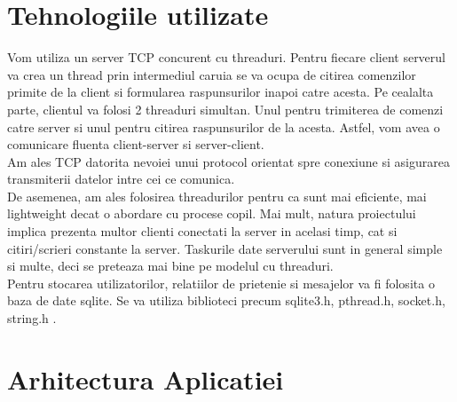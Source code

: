 \documentclass[runningheads]{llncs}
\begin{document}
\section{Tehnologiile utilizate}
Vom utiliza un server TCP concurent cu threaduri. Pentru fiecare client serverul va crea un thread prin intermediul caruia se va ocupa de citirea comenzilor primite de la client si formularea raspunsurilor inapoi catre acesta. Pe cealalta parte, clientul va folosi 2 threaduri simultan. Unul pentru trimiterea de comenzi catre server si unul pentru citirea raspunsurilor de la acesta. Astfel, vom avea o comunicare fluenta client-server si server-client.\\
Am ales TCP datorita nevoiei unui protocol orientat spre conexiune si asigurarea transmiterii datelor intre cei ce comunica.\\
De asemenea, am ales folosirea threadurilor pentru ca sunt mai eficiente, mai lightweight decat o abordare cu procese copil. Mai mult, natura proiectului implica prezenta multor clienti conectati la server in acelasi timp, cat si citiri/scrieri  constante la server. Taskurile date serverului sunt in general simple si multe, deci se preteaza mai bine pe modelul cu threaduri.\\
Pentru stocarea utilizatorilor, relatiilor de prietenie si mesajelor va fi folosita o baza de date sqlite. 
Se va utiliza biblioteci precum sqlite3.h, pthread.h, socket.h, string.h .\\
\section{Arhitectura Aplicatiei}
\end{document}
